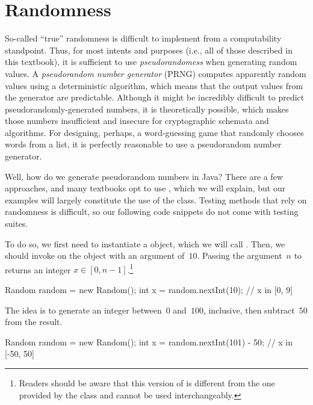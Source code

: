 \section{Randomness}
So-called ``true'' randomness is difficult to implement from a computability standpoint. 
Thus, for most intents and purposes (i.e., all of those described in this textbook), it is sufficient to use \emph{pseudorandomess} when generating random values. 
A \emph{pseudorandom number generator} (PRNG) computes apparently random values using a deterministic algorithm, which means that the output values from the generator are predictable. 
Although it might be incredibly difficult to predict pseudorandomly-generated numbers, it is theoretically possible, which makes those numbers insufficient and insecure for cryptographic schemata and algorithms. 
For designing, perhaps, a word-guessing game that randomly chooses words from a list, it is perfectly reasonable to use a pseudorandom number generator.

Well, how do we generate pseudorandom numbers in Java? 
There are a few approaches, and many textbooks opt to use , which we will explain, but our examples will largely constitute the use of the  class. 
Testing methods that rely on randomness is difficult, so our following code snippets do not come with testing suites. 

To do so, we first need to instantiate a  object, which we will call . 
Then, we should invoke  on the  object with an argument of~$10$. Passing the argument~$n$ to  returns an integer $x \in [0, n-1]$.\footnote{Readers should be aware that this version of  is different from the one provided by the  class and cannot be used interchangeably.}

\begin{verbnobox}[\small]
Random random = new Random();
int x = random.nextInt(10); // x in [0, 9]
\end{verbnobox}

The idea is to generate an integer between~$0$ and~$100$, inclusive, then subtract~$50$ from the result.

\begin{verbnobox}[\small]
Random random = new Random();
int x = random.nextInt(101) - 50; // x in [-50, 50]
\end{verbnobox}


